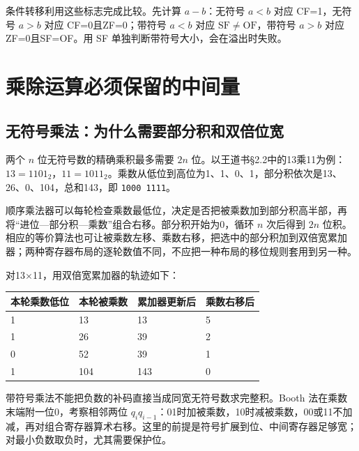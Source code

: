 条件转移利用这些标志完成比较。先计算 \(a-b\)：无符号 \(a<b\) 对应 CF=1，无符号 \(a>b\) 对应 CF=0且ZF=0；带符号 \(a<b\) 对应 \(\mathrm{SF}\ne\mathrm{OF}\)，带符号 \(a>b\) 对应ZF=0且SF=OF。用 SF 单独判断带符号大小，会在溢出时失败。

\section{乘除运算必须保留的中间量}\label{CO02-15}

\subsection{无符号乘法：为什么需要部分积和双倍位宽}\label{CO02-16}

两个 \(n\) 位无符号数的精确乘积最多需要 \(2n\) 位。以王道书§2.2中的13乘11为例：\(13=1101_2\)，\(11=1011_2\)。乘数从低位到高位为1、1、0、1，部分积依次是13、26、0、104，总和143，即 \texttt{1000 1111}。

顺序乘法器可以每轮检查乘数最低位，决定是否把被乘数加到部分积高半部，再将``进位---部分积---乘数''组合右移。部分积开始为0，循环 \(n\) 次后得到 \(2n\) 位积。相应的等价算法也可让被乘数左移、乘数右移，把选中的部分积加到双倍宽累加器；两种寄存器布局的逐轮数值不同，不应把一种布局的移位规则套用到另一种。

对13\ensuremath{\times}11，用双倍宽累加器的轨迹如下：

\begin{wideblock}\par\medskip\noindent\begin{minipage}{\linewidth}\fontsize{9.3}{12}\selectfont\begin{tabularx}{\linewidth}{@{}YYYY@{}}
\toprule\noalign{}
本轮乘数低位 & 本轮被乘数 & 累加器更新后 & 乘数右移后 \\
\midrule\noalign{}


1 & 13 & 13 & 5 \\
1 & 26 & 39 & 2 \\
0 & 52 & 39 & 1 \\
1 & 104 & 143 & 0 \\
\bottomrule\end{tabularx}
\end{minipage}\par\medskip\end{wideblock}

带符号乘法不能把负数的补码直接当成同宽无符号数求完整积。Booth 法在乘数末端附一位0，考察相邻两位 \(q_iq_{i-1}\)：01时加被乘数，10时减被乘数，00或11不加减，再对组合寄存器算术右移。这里的前提是符号扩展到位、中间寄存器足够宽；对最小负数取负时，尤其需要保护位。

